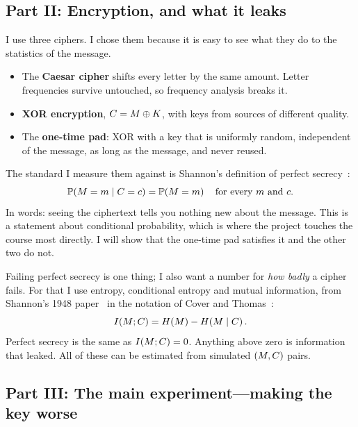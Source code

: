 \subsection{Part II: Encryption, and what it leaks}

I use three ciphers. I chose them because it is easy to see what they do to
the statistics of the message.
\begin{itemize}
  \item The \textbf{Caesar cipher} shifts every letter by the same amount.
        Letter frequencies survive untouched, so frequency analysis breaks
        it.
  \item \textbf{XOR encryption}, $C = M \oplus K$, with keys from
        sources of different quality.
  \item The \textbf{one-time pad}: XOR with a key that is uniformly random,
        independent of the message, as long as the message, and never
        reused.
\end{itemize}
The standard I measure them against is Shannon's definition of perfect
secrecy~\cite{shannon1949}:
\[
  \mathbb{P}\!\left(M = m \mid C = c\right) = \mathbb{P}\!\left(M = m\right)
  \quad\text{for every } m \text{ and } c .
\]
In words: seeing the ciphertext tells you nothing new about the message. This
is a statement about conditional probability, which is where the project
touches the course most directly. I will show that the one-time pad satisfies
it and the other two do not.

Failing perfect secrecy is one thing; I also want a number for \emph{how
badly} a cipher fails. For that I use entropy, conditional entropy and mutual
information, from Shannon's 1948 paper~\cite{shannon1948} in the notation of
Cover and Thomas~\cite{cover2006}:
\[
  I\!\left(M ; C\right) = H\!\left(M\right) - H\!\left(M \mid C\right) .
\]
Perfect secrecy is the same as $I\!\left(M ; C\right) = 0$. Anything above zero is
information that leaked. All of these can be estimated from simulated
$(M, C)$ pairs.

\subsection{Part III: The main experiment---making the key worse}

